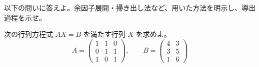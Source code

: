 
以下の問いに答えよ。余因子展開・掃き出し法など、用いた方法を明示し、導出過程を示せ。

次の行列方程式 $AX = B$ を満たす行列 $X$ を求めよ。
\[
A =
\begin{pmatrix}
1 & 1 & 0 \\
0 & 1 & 1 \\
1 & 0 & 1
\end{pmatrix},
\qquad
B =
\begin{pmatrix}
4 & 3 \\
3 & 5 \\
1 & 6
\end{pmatrix}
\]
